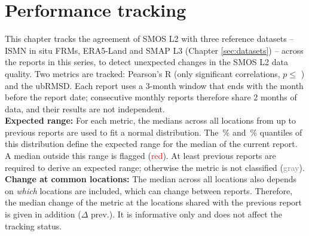 \section{Performance tracking} \label{sec:tracking}

\noindent This chapter tracks the agreement of \ac{SMOS} \ac{L2} with three reference datasets -- \ac{ISMN} in situ \ac{FRMs}, ERA5-Land and \ac{SMAP} \ac{L3} (Chapter \ref{sec:datasets}) -- across the reports in this series, to detect unexpected changes in the \ac{SMOS} \ac{L2} data quality.
Two metrics are tracked: Pearson's R (only significant correlations, $p \leq$ ) and the \ac{ubRMSD}.
Each report uses a 3-month window that ends with the month before the report date; consecutive monthly reports therefore share 2 months of data, and their results are not independent.
\\[1em]
\noindent\textbf{Expected range:} For each metric, the medians across all locations from up to  previous reports are used to fit a normal distribution.
The \,\% and \,\% quantiles of this distribution define the expected range for the median of the current report.
A median outside this range is flagged (\textcolor{red}{red}).
At least  previous reports are required to derive an expected range; otherwise the metric is not classified (\textcolor{gray}{gray}).
\\[1em]
\noindent\textbf{Change at common locations:} The median across all locations also depends on \textit{which} locations are included, which can change between reports.
Therefore, the median change of the metric at the locations shared with the previous report is given in addition ($\Delta$ prev.).
It is informative only and does not affect the tracking status.


